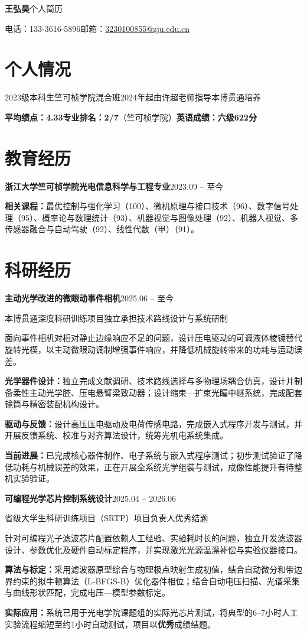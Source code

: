 \documentclass[11pt,a4paper]{article}
\newcommand{\projectheading}[3]{%
  \Needspace{6\baselineskip}%
  \noindent\textbf{#1}\hfill{\small\color{CVGray}#2}\par
  {\small\color{CVBlue}#3}\par\vspace{1pt}}
\newcommand{\projectgap}{\vspace{3pt}}
\begin{document}
{\fontsize{24}{29}\selectfont\bfseries 王弘昊}\hfill{\large\color{CVGray}个人简历}\par
\vspace{3pt}
电话：133-3616-5896\quad 邮箱：\href{mailto:3230100855@zju.edu.cn}{3230100855@zju.edu.cn}

\section{个人情况}
2023级本科生\quad 竺可桢学院混合班\quad 2024年起由许超老师指导本博贯通培养\par
\textbf{平均绩点：4.33}\qquad\textbf{专业排名：2/7}（竺可桢学院）\qquad \textbf{英语成绩：六级622分}

\section{教育经历}
\textbf{浙江大学\quad 竺可桢学院\quad 光电信息科学与工程专业}\hfill 2023.09 -- 至今\par
\textbf{相关课程：}最优控制与强化学习（100）、微机原理与接口技术（96）、数字信号处理（95）、概率论与数理统计（93）、机器视觉与图像处理（92）、机器人视觉、多传感器融合与自动驾驶（92）、线性代数（甲）（91）。

\section{科研经历}
\projectheading{主动光学改进的微眼动事件相机}{2025.06 -- 至今}{本博贯通深度科研训练项目\qquad 独立承担技术路线设计与系统研制}
面向事件相机对相对静止边缘响应不足的问题，设计压电驱动的可调液体棱镜替代旋转光楔，以主动微眼动调制增强事件响应，并降低机械旋转带来的功耗与运动误差。\par
\textbf{光学器件设计：}独立完成文献调研、技术路线选择与多物理场耦合仿真，设计并制备柔性主动光学腔、压电悬臂梁致动器；设计缩束—扩束光瞳中继系统，完成配套镜筒与精密装配机构设计。\par
\textbf{驱动与反馈：}设计高压压电驱动及电荷传感电路，完成嵌入式程序开发与测试，并开展反馈系统、校准与对齐算法设计，统筹光机电系统集成。\par
\textbf{当前进展：}已完成核心器件制作、电子系统与嵌入式程序测试；初步测试验证了降低功耗与机械误差的效果，正在开展全系统光学组装与测试，成像性能提升有待整机实验验证。

\projectgap
\projectheading{可编程光学芯片控制系统设计}{2025.04 -- 2026.06}{省级大学生科研训练项目（SRTP）\qquad 项目负责人\qquad 优秀结题}
针对可编程光子滤波芯片配置依赖人工经验、实验耗时长的问题，独立开发滤波器设计、参数优化及硬件自动标定程序，并实现激光光源温漂补偿与实验仪器接口。\par
\textbf{算法与标定：}采用滤波器原型综合与物理极点映射生成初值，结合自动微分和带边界约束的拟牛顿算法（L-BFGS-B）优化器件相位；结合自动电压扫描、光谱采集与曲线形状匹配，完成电压—模型参数标定。\par
\textbf{实际应用：}系统已用于光电学院课题组的实际光芯片测试，将典型的6--7小时人工实验流程缩短至约1小时自动测试，项目以\textbf{优秀}成绩结题。
\end{document}
